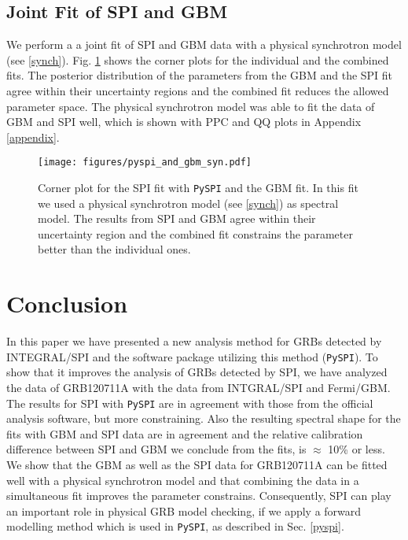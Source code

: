 \documentclass[twocolumn]{aa}
\begin{document}
\subsection{Joint Fit of SPI and GBM}
\label{pyspi_gbm_joined}
We perform a a joint fit of SPI and GBM data with a physical synchrotron model (see \ref{synch}). Fig. \ref{fig:corner_gbm_pyspi_joined_syn} shows the corner plots for the individual and the combined fits. The posterior distribution of the parameters from the GBM and the SPI fit agree within their uncertainty regions and the combined fit reduces the allowed parameter space. The physical synchrotron model was able to fit the data of GBM and SPI well, which is shown with PPC and QQ plots in Appendix \ref{appendix}.

\begin{figure}
  \begin{centering}
    \texttt{[image: figures/pyspi\_and\_gbm\_syn.pdf]}
    \caption{Corner plot for the SPI fit with {\tt PySPI} and the GBM fit. In this fit we used a physical synchrotron model (see \ref{synch}) as spectral model. The results from SPI and GBM agree within their uncertainty region and the combined fit constrains the parameter better than the individual ones.}
    \label{fig:corner_gbm_pyspi_joined_syn}
  \end{centering}
\end{figure}

\section{Conclusion}
\label{conclusion}
In this paper we have presented a new analysis method for GRBs detected by INTEGRAL/SPI and the software package utilizing this method ({\tt PySPI}).
To show that it improves the analysis of GRBs detected by SPI, we have analyzed the data of GRB120711A with the data from INTGRAL/SPI and Fermi/GBM. The results for SPI with {\tt PySPI} are in agreement with those from the official analysis software, but more constraining. Also the resulting spectral shape for the fits with GBM and SPI data are in agreement and the relative calibration difference between SPI and GBM we conclude from the fits, is $\approx$ 10\% or less. We show that the GBM as well as the SPI data for GRB120711A can be fitted well with a physical synchrotron model and that combining the data in a simultaneous fit improves the parameter constrains. Consequently, SPI can play an important role in physical GRB model checking, if we apply a forward modelling method which is used in {\tt PySPI}, as described in Sec. \ref{pyspi}.
\end{document}
